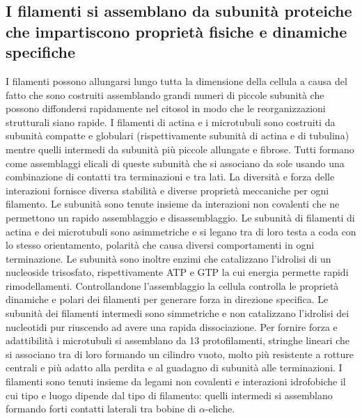 \subsection{I filamenti si assemblano da subunit\`a proteiche che impartiscono propriet\`a fisiche e dinamiche specifiche}
I filamenti possono allungarsi lungo tutta la dimensione della cellula a causa del fatto che sono costruiti assemblando grandi numeri di piccole subunit\`a che possono diffondersi
rapidamente nel citosol in modo che le reorganizzazioni strutturali siano rapide. I filamenti di actina e i microtubuli sono costruiti da subunit\`a compatte e globulari (rispettivamente
subunit\`a di actina e di tubulina) mentre quelli intermedi da subunit\`a pi\`u piccole allungate e fibrose. Tutti formano come assemblaggi elicali di queste subunit\`a che si associano
da sole usando una combinazione di contatti tra terminazioni e tra lati. La diversit\`a e forza delle interazioni fornisce diversa stabilit\`a e diverse propriet\`a meccaniche per ogni
filamento. Le subunit\`a sono tenute insieme da interazioni non covalenti che ne permettono un rapido assemblaggio e disassemblaggio. Le subunit\`a di filamenti di actina e dei 
microtubuli sono asimmetriche e si legano tra di loro testa a coda con lo stesso orientamento, polarit\`a che causa diversi comportamenti in ogni terminazione. Le subunit\`a sono inoltre
enzimi che catalizzano l'idrolisi di un nucleoside trisosfato, rispettivamente ATP e GTP la cui energia permette rapidi rimodellamenti. Controllandone l'assemblaggio la cellula controlla
le propriet\`a dinamiche e polari dei filamenti per generare forza in direzione specifica. Le subunit\`a dei filamenti intermedi sono simmetriche e non catalizzano l'idrolisi dei 
nucleotidi pur riuscendo ad avere una rapida dissociazione. Per fornire forza e adattibilit\`a i microtubuli si assemblano da 13 protofilamenti, stringhe lineari che si associano tra di 
loro formando un cilindro vuoto, molto pi\`u resistente a rotture centrali e pi\`u adatto alla perdita e al guadagno di subunit\`a alle terminazioni. I filamenti sono tenuti insieme
da legami non covalenti e interazioni idrofobiche il cui tipo e luogo dipende dal tipo di filamento: quelli intermedi si assemblano formando forti contatti laterali tra bobine di 
$\alpha$-eliche. 
